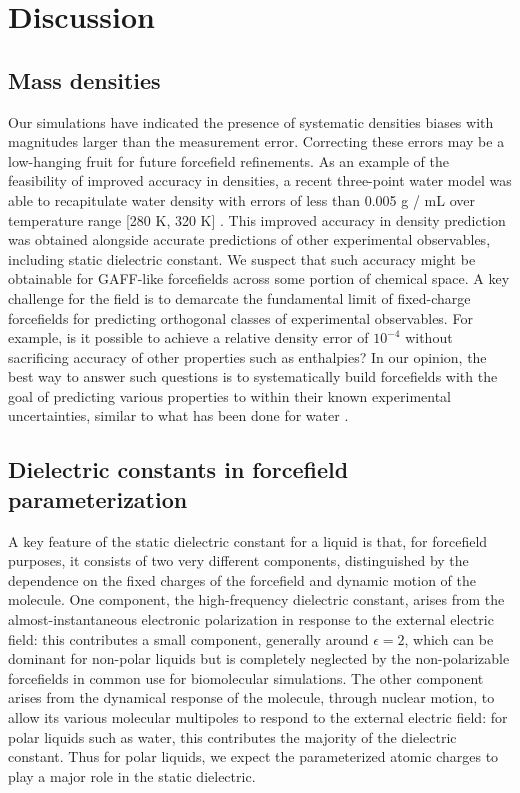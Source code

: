 \documentclass[aps,pre,twocolumn,nofootinbib,superscriptaddress,linenumbers]{revtex4-1}
\begin{document}
\section{Discussion}

\subsection{Mass densities}

Our simulations have indicated the presence of systematic densities biases with magnitudes larger than the measurement error.  
Correcting these errors may be a low-hanging fruit for future forcefield refinements.
As an example of the feasibility of improved accuracy in densities, a recent three-point water model was able to recapitulate water density with errors of less than 0.005 g / mL over temperature range [280 K, 320 K] \cite{wang2014building}.
This improved accuracy in density prediction was obtained alongside accurate predictions of other experimental observables, including static dielectric constant.  
We suspect that such accuracy might be obtainable for GAFF-like forcefields across some portion of chemical space.  
A key challenge for the field is to demarcate the fundamental limit of fixed-charge forcefields for predicting orthogonal classes of experimental observables.
For example, is it possible to achieve a relative density error of $10^{-4}$ without sacrificing accuracy of other properties such as enthalpies?
In our opinion, the best way to answer such questions is to systematically build forcefields with the goal of predicting various properties to within their known experimental uncertainties, similar to what has been done for water \cite{horn2004, wang2014building}.



\subsection{Dielectric constants in forcefield parameterization}


A key feature of the static dielectric constant for a liquid is that, for forcefield purposes, it consists of two very different components, distinguished by the dependence on the fixed charges of the forcefield and dynamic motion of the molecule. One component, the high-frequency dielectric constant, arises from the almost-instantaneous electronic polarization in response to the external electric field: this contributes a small component, generally around $\epsilon = 2$, which can be dominant for non-polar liquids but is completely neglected by the non-polarizable forcefields in common use for biomolecular simulations. The other component arises from the dynamical response of the molecule, through nuclear motion, to allow its various molecular multipoles to respond to the external electric field: for polar liquids such as water, this contributes the majority of the dielectric constant. Thus for polar liquids, we expect the parameterized atomic charges to play a major role in the static dielectric.  
\end{document}
